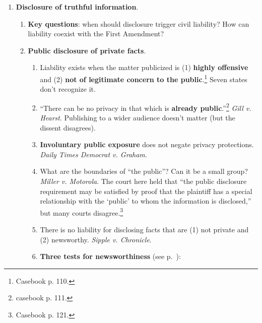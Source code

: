 \begin{enumerate}
\begin{enumerate}
\begin{enumerate}
        \end{enumerate}
        \item \textbf{Video Voyeurism Prevntion Act}: prevents intentionally 
        capturing images of intimate areas under circumstances (1) where the 
        person believed he could disrobe in privacy or (2) where intimate 
        areas would not be visible to the public.\footnote{Casebook pp. 
        107--108.}
    \end{enumerate}
    \item \textbf{Disclosure of truthful information}.
    \begin{enumerate}
        \item \textbf{Key questions}: when should disclosure trigger civil 
        liability? How can liability coexist with the First Amendment?
        \item \textbf{Public disclosure of private facts}.
        \begin{enumerate}
            \item Liability exists when the matter publicized is (1) 
            \textbf{highly offensive} and (2) \textbf{not of legitimate 
            concern to the public}.\footnote{Casebook p. 110.} Seven states 
            don't recognize it.
            \item ``There can be no privacy in that which is \textbf{already 
            public}.''\footnote{casebook p. 111.} \emph{Gill v. Hearst}. 
            Publishing to a wider audience doesn't matter (but the dissent 
            disagrees).
            \item \textbf{Involuntary public exposure} does not negate privacy 
            protections. \emph{Daily Times Democrat v. Graham}.
            \item What are the boundaries of ``the public''? Can it be a small 
            group? \emph{Miller v. Motorola}. The court here held that ``the 
            public disclosure requirement may be satisfied by proof that the 
            plaintiff has a special relationship with the `public' to whom the 
            information is disclosed,'' but many courts 
            disagree.\footnote{Casebook p. 121.}
            \item There is no liability for disclosing facts that are (1) not 
            private and (2) newsworthy. \emph{Sipple v. Chronicle}.
            \item \textbf{Three tests for newsworthiness} (see 
            p.~\pageref{par:newsworthiness}):
            \begin{enumerate}

\end{enumerate}
\end{enumerate}
\end{enumerate}
\end{enumerate}
